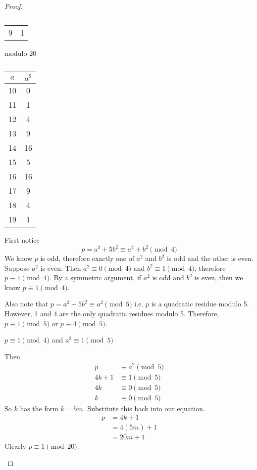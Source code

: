 \begin{proof}
\begin{table}[H]
\begin{subtable}[b]{.24\linewidth}
\begin{tabular}{c|c}
		9 & 1 \\
	\end{tabular}
	\caption*{modulo 20}
\end{subtable}
\begin{subtable}[b]{.24\linewidth}
	\centering
	\begin{tabular}{c|c}
		$a$ & $a^2$ \\ \hline
		10 & 0 \\
		11 & 1 \\
		12 & 4 \\
		13 & 9 \\
		14 & 16 \\
		15 & 5 \\
		16 & 16 \\
		17 & 9 \\
		18 & 4 \\
		19 & 1
	\end{tabular}
	\caption*{}
\end{subtable}
\end{table}

First notice
\[ p = a^2 + 5b^2 \equiv a^2 + b^2 \pmod{4} \]
We know $p$ is odd, therefore exactly one of $a^2$ and $b^2$ is odd and the
other is even. Suppose $a^2$ is even. Then $a^2 \equiv 0 \pmod 4$ and
$b^2 \equiv 1 \pmod 4$, therefore $p \equiv 1 \pmod 4$. By a symmetric argument,
if $a^2$ is odd and $b^2$ is even, then we know $p \equiv 1 \pmod 4$.


Also note that $p = a^2 + 5b^2 \equiv a^2 \pmod 5$ i.e. $p$ is a quadratic
residue modulo 5. However, 1 and 4 are the only quadratic residues modulo 5.
Therefore, $p \equiv 1 \pmod 5$ or $p \equiv 4 \pmod 5$.

\begin{case}
$p \equiv 1 \pmod 4$ and $a^2 \equiv 1 \pmod 5$

Then
\begin{align*}
		  p &\equiv a^2 \pmod 5 \\
	 4k + 1 &\equiv 1 \pmod 5 \\
	     4k &\equiv 0 \pmod 5 \\
	      k &\equiv 0 \pmod 5
\end{align*}
So $k$ has the form $k=5m$. Substitute this back into our equation.
\begin{align*}
	p &= 4k + 1 \\
	  &= 4(5m) + 1 \\
	  &= 20m + 1
\end{align*}
Clearly $p \equiv 1 \pmod{20}$.
\end{case}


\end{proof}
